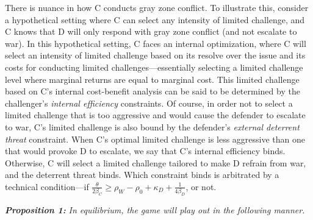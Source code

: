 \documentclass[bibtex, autowc]{apsr_submission}
\begin{document}
    There is nuance in how C conducts gray zone conflict. To illustrate this, consider a hypothetical setting where C can select any intensity of limited challenge, and C knows that D will only respond with gray zone conflict (and not escalate to war). In this hypothetical setting, C faces an internal optimization, where C will select an intensity of limited challenge based on its resolve over the issue and its costs for conducting limited challenges---essentially selecting a limited challenge level where marginal returns are equal to marginal cost. This limited challenge based on C's internal cost-benefit analysis can be said to be determined by the challenger's \textit{internal efficiency} constraints. Of course, in order not to select a limited challenge that is too aggressive and would cause the defender to escalate to war, C's limited challenge is also bound by the defender's \textit{external deterrent threat} constraint. When C's optimal limited challenge is less aggressive than one that would provoke D to escalate, we say that C's internal efficiency binds. Otherwise, C will select a limited challenge tailored to make D refrain from war, and the deterrent threat binds. Which constraint binds is arbitrated by a technical condition---if \textit{$\frac{\theta}{2\beta_{C}}\geq\rho_{W}-\rho_{0}+\kappa_{D}+\frac{1}{4\beta_{D}}$}, or not.
    
    \textbf{\textit{Proposition 1:}}\textit{ In equilibrium, the game will play out in the following manner.}
    
\end{document}
